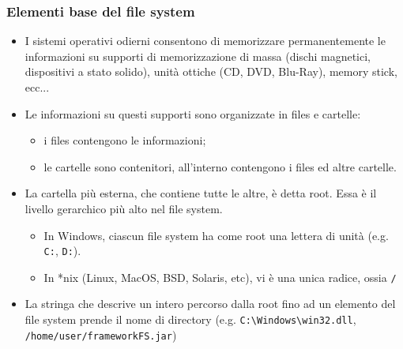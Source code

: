 \documentclass{beamer}
\begin{document}
\begin{frame}
\frametitle{Elementi base del file system}
\begin{itemize}
 \item I sistemi operativi odierni consentono di memorizzare permanentemente le informazioni su supporti di memorizzazione di massa (dischi magnetici, dispositivi a stato solido), unità ottiche (CD, DVD, Blu-Ray), memory stick, ecc...
 \item Le informazioni su questi supporti sono organizzate in files e cartelle:
  \begin{itemize}
    \item i files contengono le informazioni;
    \item le cartelle sono contenitori, all'interno contengono i files ed altre cartelle.
  \end{itemize}
 \item La cartella più esterna, che contiene tutte le altre, è detta root. Essa è il livello gerarchico più alto nel file system.
  \begin{itemize}
    \item In Windows, ciascun file system ha come root una lettera di unità (e.g. \texttt{C:}, \texttt{D:}).
    \item In *nix (Linux, MacOS, BSD, Solaris, etc), vi è una unica radice, ossia \texttt{/}
  \end{itemize}
 \item La stringa che descrive un intero percorso dalla root fino ad un elemento del file system prende il nome di directory (e.g. \texttt{C:\textbackslash{}Windows\textbackslash{}win32.dll}, \texttt{/home/user/frameworkFS.jar})
\end{itemize}
\end{frame}
\end{document}
